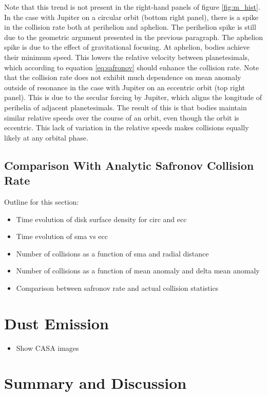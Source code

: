 \documentclass[twocolumn]{aastex63}
\begin{document}
Note that this trend is not present in the right-hand panels of figure \ref{fig:m_hist}. In the case with Jupiter on a circular orbit (bottom right panel), there is a spike in the collision rate both at perihelion and aphelion. The perihelion spike is still due to the geometric argument presented in the previous paragraph. The aphelion spike is due to the effect of gravitational focusing. At aphelion, bodies achieve their minimum speed. This lowers the relative velocity between planetesimals, which according to equation \ref{eq:safronov} should enhance the collision rate. Note that the collision rate does not exhibit much dependence on mean anomaly outside of resonance in the case with Jupiter on an eccentric orbit (top right panel). This is due to the secular forcing by Jupiter, which aligns the longitude of perihelia of adjacent planetesimals. The result of this is that bodies maintain similar relative speeds over the course of an orbit, even though the orbit is eccentric. This lack of variation in the relative speeds makes collisions equally likely at any orbital phase.

\subsection{Comparison With Analytic Safronov Collision Rate}\label{sec:saf}

Outline for this section:
\begin{itemize}
\item Time evolution of disk surface density for circ and ecc
\item Time evolution of sma vs ecc
\item Number of collisions as a function of sma and radial distance
\item Number of collisions as a function of mean anomaly and delta mean anomaly
\item Comparison between safronov rate and actual collision statistics
\end{itemize}

\section{Dust Emission} \label{sec:dust}

\begin{itemize}
\item Show CASA images
\end{itemize}

\section{Summary and Discussion} \label{sec:discuss}
\end{document}
